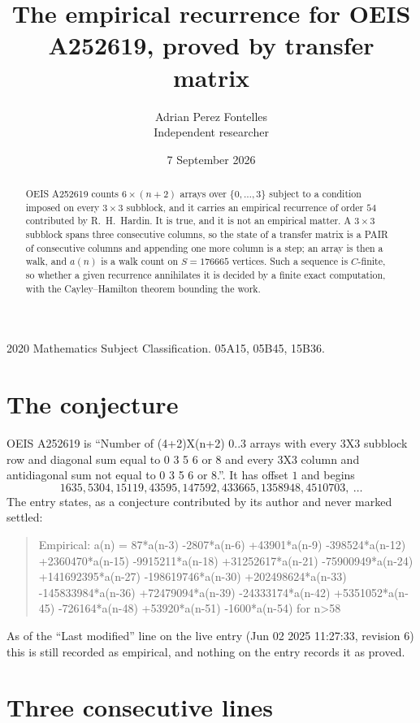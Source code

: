 \documentclass[11pt,a4paper]{article}
\title{The empirical recurrence for OEIS A252619, proved by transfer matrix}
\author{Adrian Perez Fontelles\\ \small Independent researcher}
\date{7 September 2026}
\theoremstyle{plain}
\theoremstyle{definition}
\begin{document}
\maketitle

\begin{abstract}
OEIS A252619 counts $6\times(n+2)$ arrays over $\{0,\dots,3\}$ subject to a condition imposed on
every $3\times3$ subblock, and it carries an empirical recurrence of order $54$
contributed by R.~H.~Hardin. It is true, and it is not an empirical matter. A $3\times3$
subblock spans three consecutive columns, so the state of a transfer matrix is a PAIR of
consecutive columns and appending one more column is a step; an array is then a walk, and
$a(n)$ is a walk count on $S=176665$ vertices. Such a sequence is $C$-finite, so whether a given
recurrence annihilates it is decided by a finite exact computation, with the Cayley--Hamilton
theorem bounding the work.
\end{abstract}

\noindent\small 2020 Mathematics Subject Classification. 05A15, 05B45, 15B36.\normalsize

\section{The conjecture}

OEIS A252619 is ``Number of (4+2)X(n+2) 0..3 arrays with every 3X3 subblock row and diagonal sum equal to 0 3 5 6 or 8 and every 3X3 column and antidiagonal sum not equal to 0 3 5 6 or 8.''. It has offset $1$ and begins
\[
1635, 5304, 15119, 43595, 147592, 433665, 1358948, 4510703,\ \dots
\]
The entry states, as a conjecture contributed by its author and never marked settled:
\begin{quote}
Empirical: a(n) = 87*a(n-3) -2807*a(n-6) +43901*a(n-9) -398524*a(n-12) +2360470*a(n-15) -9915211*a(n-18) +31252617*a(n-21) -75900949*a(n-24) +141692395*a(n-27) -198619746*a(n-30) +202498624*a(n-33) -145833984*a(n-36) +72479094*a(n-39) -24333174*a(n-42) +5351052*a(n-45) -726164*a(n-48) +53920*a(n-51) -1600*a(n-54) for n>58
\end{quote}
As of the ``Last modified'' line on the live entry (Jun 02 2025 11:27:33, revision 6) this is still
recorded as empirical, and nothing on the entry records it as proved.

\section{Three consecutive lines}
\end{document}
